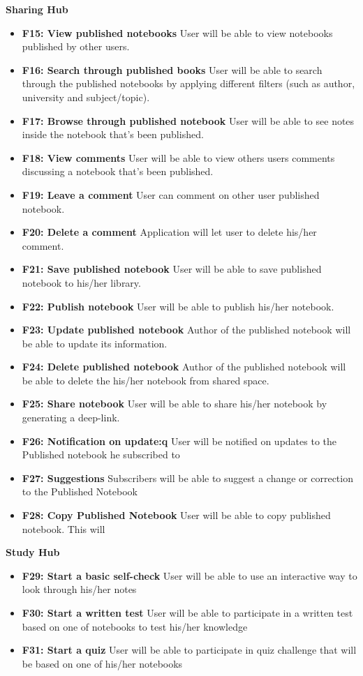 \documentclass[thesis=B,english]{FITthesis}[2012/10/20]
\begin{document}
\bigskip
\textbf{Sharing Hub}
\begin{itemize}
	\item \textbf{F15: View published notebooks} User will be able to view notebooks published by other users.
	\item \textbf{F16: Search through published books} User will be able to search through the published notebooks by applying different filters (such as author, university and subject/topic).
	\item \textbf{F17: Browse through published notebook} User will be able to see notes inside the notebook that's been published.
	\item \textbf{F18: View comments} User will be able to view others users comments discussing a notebook that's been published.
	\item \textbf{F19: Leave a comment} User can comment on other user published notebook.
	\item \textbf{F20: Delete a comment} Application will let user to delete his/her comment.
	\item \textbf{F21: Save published notebook} User will be able to save published notebook to his/her library.
	\item \textbf{F22: Publish notebook} User will be able to publish his/her notebook.
	\item \textbf{F23: Update published notebook} Author of the published notebook will be able to update its information.
	\item \textbf{F24: Delete published notebook} Author of the published notebook will be able to delete the his/her notebook from shared space.
	\item \textbf{F25: Share notebook} User will be able to share his/her notebook by generating a deep-link.
	\item \textbf{F26: Notification on update:q} User will be notified on updates to the Published notebook he subscribed to
	\item \textbf{F27: Suggestions} Subscribers will be able to suggest a change or correction to the Published Notebook
	\item \textbf{F28: Copy Published Notebook} User will be able to copy published notebook. This will 
 \end{itemize}

\bigskip
\textbf{Study Hub}
\begin{itemize}
	\item \textbf{F29: Start a basic self-check} User will be able to use an interactive way to look through his/her notes
	\item \textbf{F30: Start a written test} User will be able to participate in a written test based on one of notebooks to test his/her knowledge
	\item \textbf{F31: Start a quiz} User will be able to participate in quiz challenge that will be based on one of his/her notebooks
	
\end{itemize}
\end{document}
